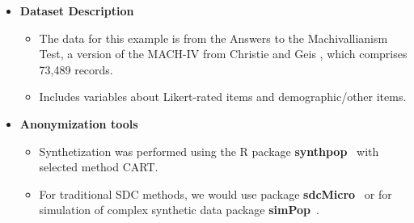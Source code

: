 \documentclass[a0,portrait]{a0poster}
\begin{document}
\begin{multicols}{3}
\begin{itemize}
    \item[\ding{228}] \textbf{Dataset Description}
        \begin{itemize}   
            \item[\textbullet] The data for this example is from the Answers to the Machivallianism Test, a version of the MACH-IV from Christie and Geis \cite{Data}, which comprises 73,489 records.
            \item[\textbullet] Includes variables about Likert-rated items and demographic/other items.
        \end{itemize}
    \item[\ding{228}] \textbf{Anonymization tools}
        \begin{itemize}   
            \item[\textbullet] Synthetization was performed using the R package \textbf{synthpop}~\cite{2022_Synthpop}
             with selected method CART.
            \item[\textbullet] For traditional SDC methods, we would use package \textbf{sdcMicro}~\cite{2024_Sdcmicro}
            or for simulation of complex synthetic data package \textbf{simPop}~\cite{2022_Simpop}.
        \end{itemize}
\end{itemize}



\end{multicols}
\end{document}
